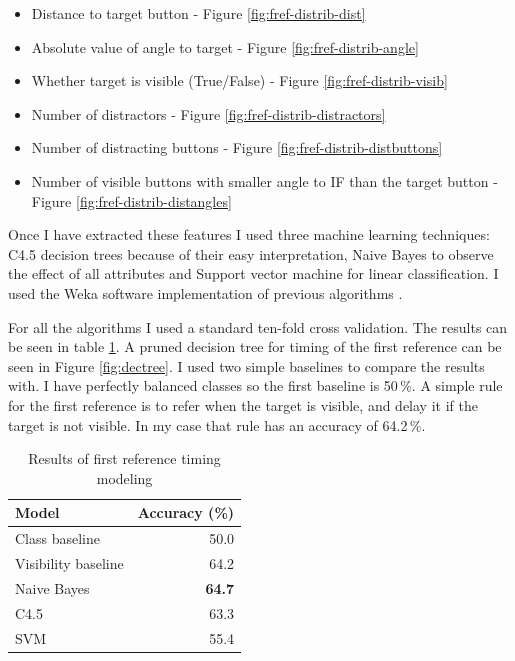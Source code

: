 \begin{itemize}
\item
Distance to target button - Figure \ref{fig:fref-distrib-dist}
\item
Absolute value of angle to target - Figure \ref{fig:fref-distrib-angle}
\item
Whether target is visible (True/False) - Figure \ref{fig:fref-distrib-visib}
\item
Number of distractors - Figure \ref{fig:fref-distrib-distractors}
\item
Number of distracting buttons - Figure \ref{fig:fref-distrib-distbuttons}
\item
Number of visible buttons with smaller angle to IF than the target button - Figure \ref{fig:fref-distrib-distangles}
\end{itemize}

Once I have extracted these features I used three machine learning techniques: C4.5 decision trees because of their easy interpretation, Naive Bayes to observe the effect of all attributes and Support vector machine for linear classification. I used the Weka software implementation of previous algorithms \citep{hall2009weka}.

For all the algorithms I used a standard ten-fold cross validation. The results can be seen in table \ref{tab:firstref}. A pruned decision tree for timing of the first reference can be seen in Figure \ref{fig:dectree}. I used two simple baselines to compare the results with. I have perfectly balanced classes so the first baseline is 50\,\%. A simple rule for the first reference is to refer when the target is visible, and delay it if the target is not visible. In my case that rule has an accuracy of 64.2\,\%. 

\begin{table}[!htbp]
 \centering
\begin{tabular}{lr}
\toprule
Model    & Accuracy (\%)  \\
\midrule
Class baseline    & 50.0\\
Visibility baseline & 64.2\\
\midrule
Naive Bayes  & \textbf{64.7} \\
C4.5 & 63.3 \\
SVM & 55.4 \\
\bottomrule
\end{tabular}
\caption{Results of first reference timing modeling}
\label{tab:firstref}
\end{table}

